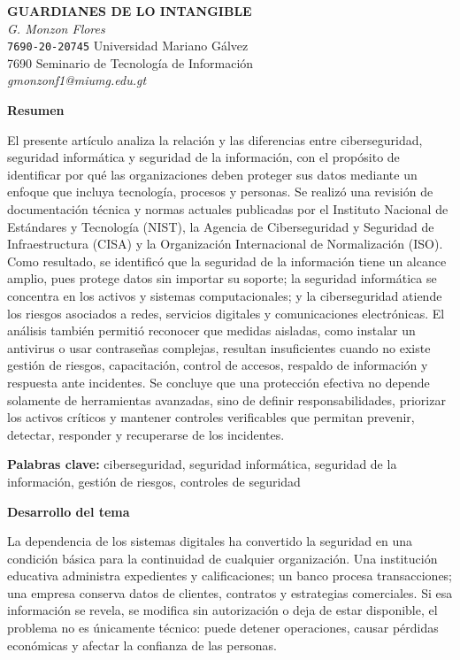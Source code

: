 \documentclass[12pt,letterpaper]{article}
\begin{document}
\begin{center}
{\textbf{GUARDIANES DE LO INTANGIBLE}}\\[0.25cm]
\textit{G. Monzon Flores}\\
\texttt{7690-20-20745} Universidad Mariano Gálvez\\
7690 Seminario de Tecnología de Información\\
\textit{gmonzonf1@miumg.edu.gt}
\end{center}

\textbf{Resumen}

El presente artículo analiza la relación y las diferencias entre ciberseguridad, seguridad informática y seguridad de la información, con el propósito de identificar por qué las organizaciones deben proteger sus datos mediante un enfoque que incluya tecnología, procesos y personas. Se realizó una revisión de documentación técnica y normas actuales publicadas por el Instituto Nacional de Estándares y Tecnología (NIST), la Agencia de Ciberseguridad y Seguridad de Infraestructura (CISA) y la Organización Internacional de Normalización (ISO). Como resultado, se identificó que la seguridad de la información tiene un alcance amplio, pues protege datos sin importar su soporte; la seguridad informática se concentra en los activos y sistemas computacionales; y la ciberseguridad atiende los riesgos asociados a redes, servicios digitales y comunicaciones electrónicas. El análisis también permitió reconocer que medidas aisladas, como instalar un antivirus o usar contraseñas complejas, resultan insuficientes cuando no existe gestión de riesgos, capacitación, control de accesos, respaldo de información y respuesta ante incidentes. Se concluye que una protección efectiva no depende solamente de herramientas avanzadas, sino de definir responsabilidades, priorizar los activos críticos y mantener controles verificables que permitan prevenir, detectar, responder y recuperarse de los incidentes.

\textbf{Palabras clave:} ciberseguridad, seguridad informática, seguridad de la información, gestión de riesgos, controles de seguridad

\textbf{Desarrollo del tema}

La dependencia de los sistemas digitales ha convertido la seguridad en una condición básica para la continuidad de cualquier organización. Una institución educativa administra expedientes y calificaciones; un banco procesa transacciones; una empresa conserva datos de clientes, contratos y estrategias comerciales. Si esa información se revela, se modifica sin autorización o deja de estar disponible, el problema no es únicamente técnico: puede detener operaciones, causar pérdidas económicas y afectar la confianza de las personas.
\end{document}
